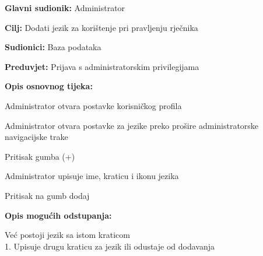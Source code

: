 					
					\noindent {}
					\begin{packed_item}
						\item \textbf{Glavni sudionik:} Administrator
						\item \textbf{Cilj:} Dodati jezik za korištenje pri pravljenju rječnika
						\item \textbf{Sudionici:} Baza podataka
						\item \textbf{Preduvjet:} Prijava s administratorskim privilegijama
						\item \textbf{Opis osnovnog tijeka:}
						\begin{packed_enum}
							\item Administrator otvara postavke korisničkog profila
							\item Administrator otvara postavke za jezike preko prošire administratorske navigacijske trake
							\item Pritisak gumba (+)
							\item Administrator upisuje ime, kraticu i ikonu jezika
							\item Pritisak na gumb dodaj
						\end{packed_enum}
						\item \textbf{Opis mogućih odstupanja:}
						\begin{packed_item}
							\item [5.a] Već postoji jezik sa istom kraticom
							\\1. Upisuje drugu kraticu za jezik ili odustaje od dodavanja
						\end{packed_item}
					\end{packed_item}
					
